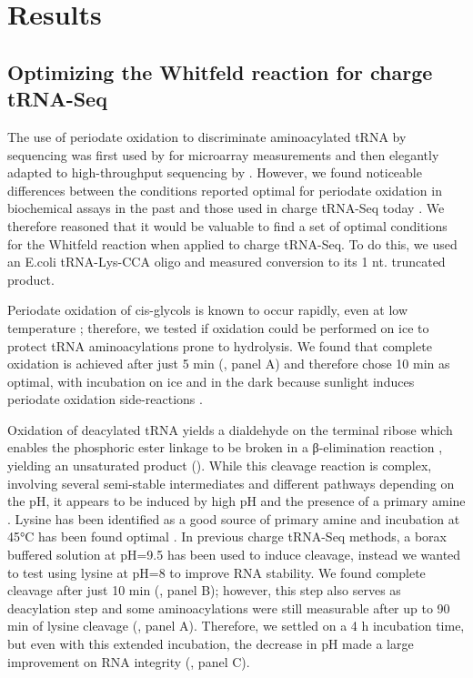\documentclass[9pt,lineno]{elife}
\begin{document}
\section{Results}
\subsection{Optimizing the Whitfeld reaction for charge tRNA-Seq}
The use of periodate oxidation to discriminate aminoacylated tRNA by sequencing was first used by \cite{Dittmar2005-va} for microarray measurements and then elegantly adapted to high-throughput sequencing by \cite{Evans2017-st}.
However, we found noticeable differences between the conditions reported optimal for periodate oxidation in biochemical assays in the past \citep{Khym1961-xf, Neu1964-hu, Khym1968-ac, Dyer1956-zh} and those used in charge tRNA-Seq today \citep{Evans2017-st, Behrens2021-gb, Watkins2022-er, Pavlova2020-aj, Tsukamoto2022-rc}.
We therefore reasoned that it would be valuable to find a set of optimal conditions for the Whitfeld reaction when applied to charge tRNA-Seq.
To do this, we used an E.coli tRNA-Lys-CCA oligo and measured conversion to its 1 nt. truncated product.

Periodate oxidation of cis-glycols is known to occur rapidly, even at low temperature \citep{Dyer1956-zh}; therefore, we tested if oxidation could be performed on ice to protect tRNA aminoacylations prone to hydrolysis.
We found that complete oxidation is achieved after just 5 min (, panel A) and therefore chose 10 min as optimal, with incubation on ice and in the dark because sunlight induces periodate oxidation side-reactions \citep{Erskine1953-cr}.

Oxidation of deacylated tRNA yields a dialdehyde on the terminal ribose which enables the phosphoric ester linkage to be broken in a β-elimination reaction \citep{Rammler1971-mt, uziel1973periodate}, yielding an unsaturated product ().
While this cleavage reaction is complex, involving several semi-stable intermediates and different pathways depending on the pH, it appears to be induced by high pH and the presence of a primary amine \citep{Uziel1975-ja}.
Lysine has been identified as a good source of primary amine and incubation at 45°C has been found optimal \citep{Khym1961-xf, Neu1964-hu}.
In previous charge tRNA-Seq methods, a borax buffered solution at pH=9.5 has been used to induce cleavage, instead we wanted to test using lysine at pH=8 to improve RNA stability.
We found complete cleavage after just 10 min (, panel B); however, this step also serves as deacylation step and some aminoacylations were still measurable after up to 90 min of lysine cleavage (, panel A).
Therefore, we settled on a 4 h incubation time, but even with this extended incubation, the decrease in pH made a large improvement on RNA integrity (, panel C).
\end{document}
